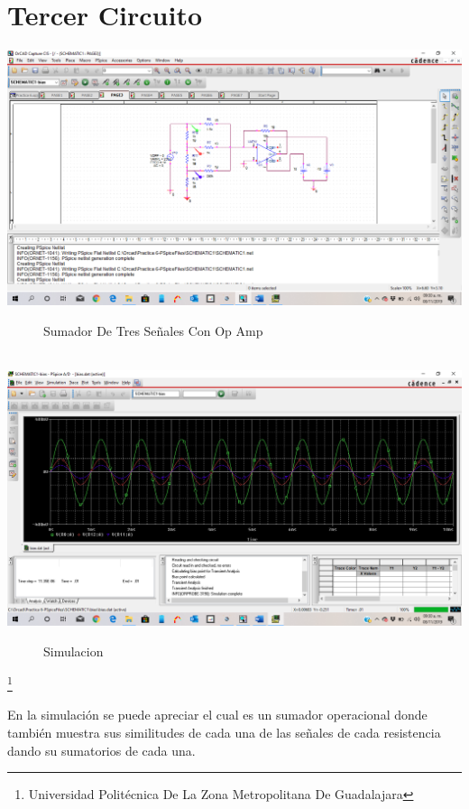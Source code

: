 \documentclass[10pt,a4paper]{article}
\begin{document}
\section{Tercer Circuito}
\begin{center}
 \includegraphics[scale=0.2]{5.png}
 \begin{figure}[hbtp]
 \caption{Sumador De Tres Señales Con Op Amp}
 \centering
 \end{figure}\\
  \includegraphics[scale=0.2]{6.png}
 \begin{figure}[hbtp]
 \caption{Simulacion}
 \centering
 \end{figure} 
\end{center}

\footnote{Universidad Politécnica De La Zona Metropolitana De Guadalajara} 

\newpage

En la simulación se puede apreciar el cual es un sumador operacional donde también muestra sus similitudes de cada una de las señales de cada resistencia dando su sumatorios de cada una.
\end{document}
